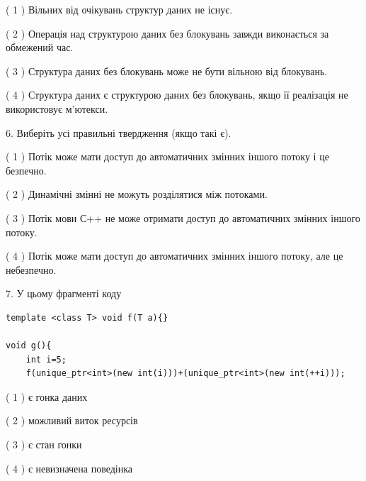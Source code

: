 \documentclass[12pt, ukrainian]{article}
\begin{document}
\begin {large}
{( 1 ) Вільних від очікувань структур даних не існує.%

( 2 ) Операція над структурою даних без блокувань завжди виконається за обмежений час.%

( 3 ) Структура даних без блокувань може не бути вільною від блокувань.%

( 4 ) Структура даних є структурою даних без блокувань, якщо її реалізація не використовує м’ютекси.%
\newpage



\vspace{5mm}
6. Виберіть усі правильні твердження (якщо такі є).\par
\vspace{2mm}

( 1 ) Потік може мати доступ до автоматичних змінних іншого потоку і це безпечно.%

( 2 ) Динамічні змінні не можуть розділятися між потоками.%

( 3 ) Потік мови С++ не може отримати доступ до автоматичних змінних іншого потоку.%

( 4 ) Потік може мати доступ до автоматичних змінних іншого потоку, але це небезпечно.%


\vspace{5mm}
7. У цьому фрагменті коду
\begin{verbatim}
template <class T> void f(T a){}

void g(){
    int i=5;
    f(unique_ptr<int>(new int(i)))+(unique_ptr<int>(new int(++i)));
\end{verbatim}
( 1 ) є гонка даних%

( 2 ) можливий виток ресурсів%

( 3 ) є стан гонки%

( 4 ) є невизначена поведінка%
}
\end {large}
\end{document}
